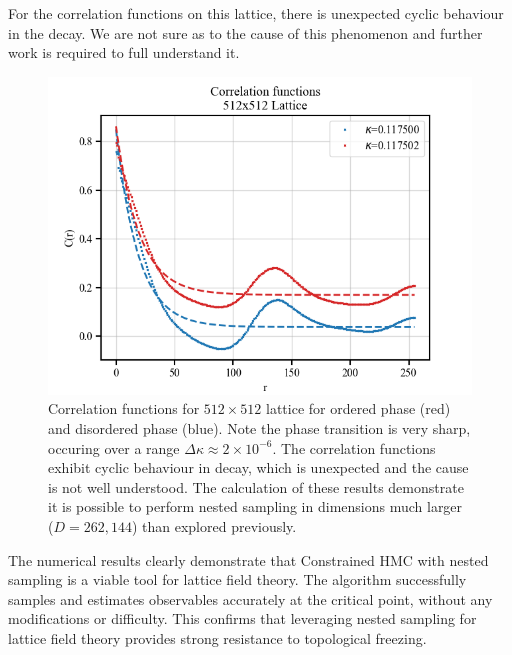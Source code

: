 \documentclass[11pt]{article}
\begin{document}
    For the correlation functions on this lattice, there is unexpected cyclic behaviour in the decay.
    We are not sure as to the cause of this phenomenon and further work is required to full understand it.
    \begin{figure}[h!]
        \center
        \includegraphics[width=\linewidth]{../figures/CorrelationFunction512}
        \caption{
            Correlation functions for $512 \times 512$ lattice for ordered phase (red) and disordered
            phase (blue).
            Note the phase transition is very sharp, occuring over a range $\Delta \kappa \approx 2 \times 10^{-6}$.
            The correlation functions exhibit cyclic behaviour in decay, which is unexpected and the
            cause is not well understood.
            The calculation of these results demonstrate it is possible to perform nested sampling in dimensions much
            larger ($D=262,144$) than explored previously.
        }\label{fig:correlation_func_512}
    \end{figure}

    The numerical results clearly demonstrate that Constrained HMC with nested sampling is a viable tool for
    lattice field theory.
    The algorithm successfully samples and estimates observables accurately at the critical point, without any
    modifications or difficulty.
    This confirms that leveraging nested sampling for lattice field theory provides strong resistance to topological freezing.
\end{document}
